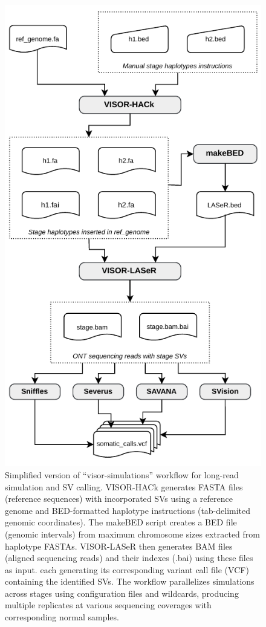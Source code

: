 \begin{figure}[H]
    \centering
    \includegraphics[scale=1.3]{img/visor-simulations.pdf}
    \caption[Simplified version of ``visor-simulations'' workflow for long-read 
    simulation and SV calling]{Simplified version of ``visor-simulations'' 
    workflow for long-read simulation and SV calling. VISOR-HACk generates FASTA 
    files (reference sequences) with incorporated SVs using a reference genome and 
    BED-formatted haplotype instructions (tab-delimited genomic coordinates). 
    The makeBED script creates a BED file (genomic intervals) from maximum 
    chromosome sizes extracted from haplotype FASTAs. VISOR-LASeR then generates 
    BAM files (aligned sequencing reads) and their indexes (.bai) using these 
    files as input. each generating its corresponding variant call file (VCF) 
    containing the identified SVs. The workflow parallelizes simulations 
    across stages using configuration files and wildcards, producing 
    multiple replicates at various sequencing coverages with corresponding 
    normal samples.}
    \label{fig:visor-sim}
\end{figure}

